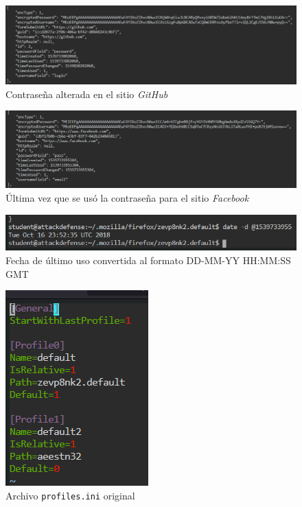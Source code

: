 \documentclass{article}
\begin{document}
        \begin{figure}[!h]
            \centering
            \includegraphics[scale=0.5]{img/github-password-changed.png}
            \caption{Contraseña alterada en el sitio \emph{GitHub}}
            \label{fig:github-password}
        \end{figure}

        \begin{figure}[!h]
            \centering
            \includegraphics[scale=0.5]{img/facebook-last-used-unix.png}
            \caption{Última vez que se usó la contraseña para el sitio \emph{Facebook}}
            \label{fig:facebook-last-used}
        \end{figure}

        \clearpage
        \begin{figure}[!h]
            \centering
            \includegraphics[scale=0.7]{img/facebook-last-used-converted.png}
            \caption{Fecha de último uso convertida al formato DD-MM-YY HH:MM:SS GMT}
            \label{fig:facebook-last-used-converted}
        \end{figure}

        \begin{figure}[!h]
            \centering
            \includegraphics[scale=0.7]{img/profiles-before.png}
            \caption{Archivo \texttt{profiles.ini} original}
            \label{fig:profiles-before}
        \end{figure}
\end{document}
